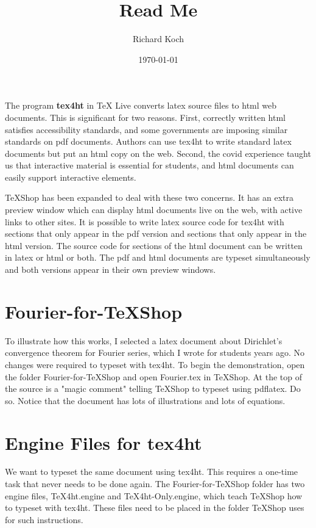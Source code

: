 \documentclass[11pt, oneside]{article}   	%
\title{Read Me}
\author{Richard Koch}
\date{\today}							%
\begin{document}
\maketitle

The program {\bf tex4ht} in TeX Live converts  latex source files to html web documents. This is significant for two reasons. First,  correctly written html  satisfies  accessibility standards, and some governments are imposing similar standards on pdf documents. Authors can use tex4ht to write standard latex documents but  put an html copy on the web.  %
Second, the covid experience taught us that interactive material is essential for students,
and html documents can easily support interactive elements. 

TeXShop has been expanded to deal with these two concerns. It has an extra preview window which can display html documents live on the web, with active links to other sites. It is possible to write latex source code for tex4ht with sections that only appear in the pdf version and  sections that only appear in the html version. The source code for sections of the html document can be written in  latex or html or both. The pdf and html documents are typeset simultaneously
and both versions appear in their own preview windows.

\section{Fourier-for-TeXShop}

To illustrate how this works, I selected a latex document about Dirichlet's convergence theorem for Fourier series, which I wrote for students years ago. No changes were required to typeset with tex4ht.
To begin the demonstration, open the folder Fourier-for-TeXShop and open Fourier.tex in TeXShop.
At the top of the source is a "magic comment" telling TeXShop to typeset using pdflatex. Do so.
Notice that the document has lots of illustrations and lots of equations.

\section{Engine Files for tex4ht}

We want to typeset the same document using tex4ht. This requires a one-time task that never needs to be done again. The Fourier-for-TeXShop folder has two engine files, TeX4ht.engine and TeX4ht-Only.engine,
which teach TeXShop how to typeset with tex4ht. These files need to be placed in the folder TeXShop uses for
such instructions. 
\end{document}
